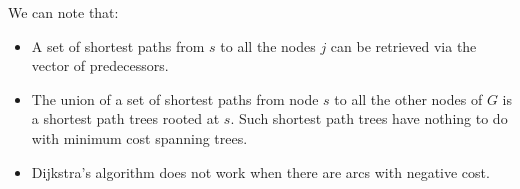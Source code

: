 \documentclass[12pt, a4paper]{report}
\newtheorem[style=M,bodystyle=\normalfont]{theorem}{Theorem}
\newtheorem[style=M,bodystyle=\normalfont]{corollary}{Corollary}
\newtheorem[style=M,bodystyle=\normalfont]{lemma}{Lemma}
\newtheorem[style=M,bodystyle=\normalfont]{definition}{Definition}
\begin{document}
    We can note that: 
    \begin{itemize}
        \item A set of shortest paths from $s$ to all the nodes $j$ can be retrieved via the vector of predecessors. 
        \item The union of a set of shortest paths from node $s$ to all the other nodes of $G$ is a shortest path trees rooted at $s$. Such shortest path trees have 
            nothing to do with minimum cost spanning trees. 
        \item Dijkstra's algorithm does not work when there are arcs with negative cost. 
    \end{itemize}
\end{document}
